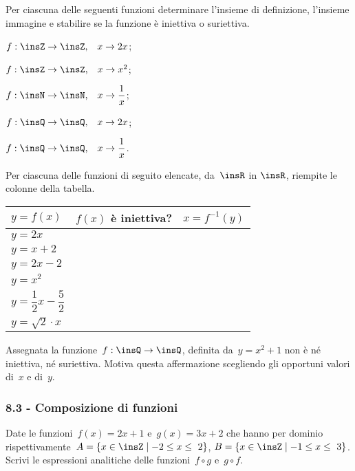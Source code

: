 \begin{esercizio}
 \label{ese:8.10}
Per ciascuna delle seguenti funzioni determinare l'insieme di definizione, l'insieme
immagine e stabilire se la funzione è iniettiva o suriettiva.

\begin{enumeratea}
\item $f:\insZ\rightarrow\insZ\text{,}\quad x\rightarrow 2x$;
\item $f:\insZ\rightarrow\insZ\text{,}\quad x\rightarrow x^{2}$;
\item $f:\insN\rightarrow\insN\text{,}\quad x\rightarrow \dfrac{1}{x}$;
\item $f:\insQ\rightarrow\insQ\text{,}\quad x\rightarrow 2x$;
\item $f:\insQ\rightarrow\insQ\text{,}\quad x\rightarrow \dfrac{1}{x}$.
\end{enumeratea}
\end{esercizio}

\begin{esercizio}
 \label{ese:8.11}
Per ciascuna delle funzioni di seguito elencate, da~$\insR$ in $\insR$, riempite le colonne della tabella.
\begin{center}
\begin{tabular}{l*2{c}}
\toprule
$y=f(x)$ & $f(x)$ è iniettiva? & $x=f^{-1}(y)$\\
\midrule
$y=2x$ & & \\
$y=x+2$ & & \\
$y=2x-2$ & & \\
$y=x^{2}$ & & \\
$y=\dfrac{1}{2}x-\dfrac{5}{2}$ & & \\
$y=\sqrt{2}\cdot x$ & & \\
\bottomrule
\end{tabular}
\end{center}
\end{esercizio}

\begin{esercizio}
 \label{ese:8.12}
Assegnata la funzione~$f:\insQ \rightarrow \insQ$, definita da~$y=x^2+1$ non è né iniettiva, né suriettiva. Motiva questa affermazione scegliendo gli opportuni valori di~$x$ e di~$y$.
\end{esercizio}

\subsubsection*{8.3 - Composizione di funzioni}
\begin{esercizio}
 \label{ese:8.13}
Date le funzioni~$f(x)=2x+1$ e~$g(x)=3x+2$ che hanno per dominio
rispettivamente~$A=\left\{x\in \insZ\mid -2\le x\le~2\right\}$,
$B=\left\{x\in \insZ\mid -1\le x\le~3\right\}$.
Scrivi le espressioni analitiche delle funzioni~$f\circ g$ e~$g\circ f$.
\end{esercizio}

